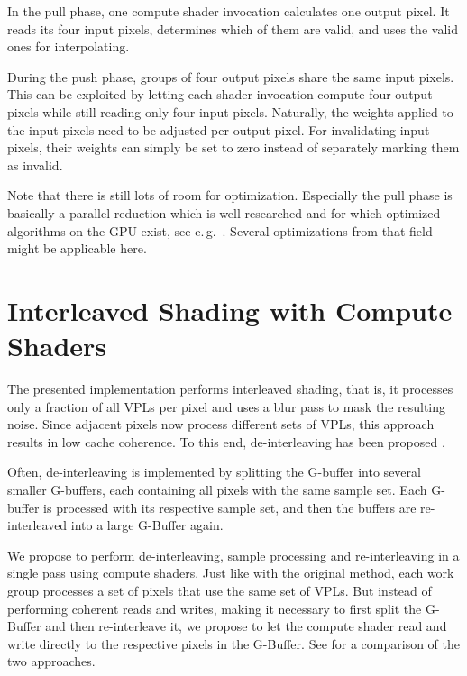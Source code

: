 In the pull phase, one compute shader invocation calculates one output pixel. It reads its four input pixels, determines which of them are valid, and uses the valid ones for interpolating.


During the push phase, groups of four output pixels share the same input pixels. This can be exploited by letting each shader invocation compute four output pixels while still reading only four input pixels. Naturally, the weights applied to the input pixels need to be adjusted per output pixel. For invalidating input pixels, their weights can simply be set to zero instead of separately marking them as invalid.

Note that there is still lots of room for optimization. Especially the pull phase is basically a parallel reduction which is well-researched and for which optimized algorithms on the GPU exist, see e.\,g.\ \citet{Harris:2007:ParallelReduction}. Several optimizations from that field might be applicable here.



\section{Interleaved Shading with Compute Shaders}
\label{sec:impl:interleavedShading}

The presented implementation performs interleaved shading, that is, it processes only a fraction of all VPLs per pixel and uses a blur pass to mask the resulting noise. Since adjacent pixels now process different sets of VPLs, this approach results in low cache coherence. To this end, de-interleaving has been proposed \citep{segovia2006non}.

Often, de-interleaving is implemented by splitting the G-buffer into several smaller G-buffers, each containing all pixels with the same sample set. Each G-buffer is processed with its respective sample set, and then the buffers are re-interleaved into a large G-Buffer again.

We propose to perform de-interleaving, sample processing and re-interleaving in a single pass using compute shaders. Just like with the original method, each work group processes a set of pixels that use the same set of VPLs. But instead of performing coherent reads and writes, making it necessary to first split the G-Buffer and then re-interleave it, we propose to let the compute shader read and write directly to the respective pixels in the G-Buffer. See  for a comparison of the two approaches.

